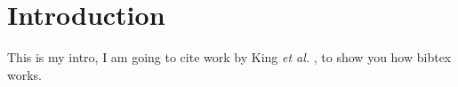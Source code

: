 \section{Introduction}

This is my intro, I am going to cite work by King \emph{et al.}
\cite{King09}, to show you how bibtex works.
